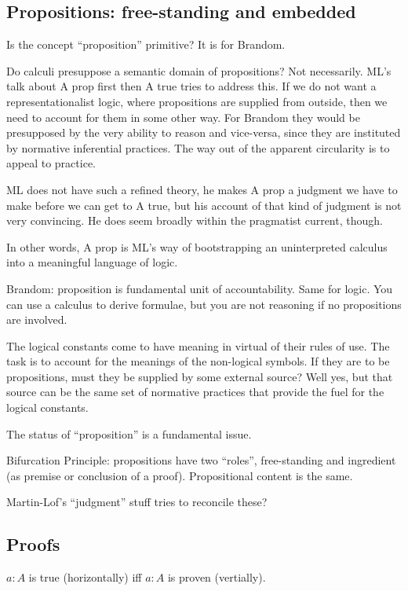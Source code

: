 \documentclass{article}
\begin{document}
\subsection{Propositions: free-standing and embedded}

Is the concept ``proposition'' primitive?  It is for Brandom.

Do calculi presuppose a semantic domain of propositions? Not
necessarily. ML's talk about A prop first then A true tries to address
this. If we do not want a representationalist logic, where
propositions are supplied from outside, then we need to account for
them in some other way. For Brandom they would be presupposed by the
very ability to reason and vice-versa, since they are instituted by
normative inferential practices. The way out of the apparent
circularity is to appeal to practice.

ML does not have such a refined theory, he makes A prop a judgment we
have to make before we can get to A true, but his account of that kind
of judgment is not very convincing. He does seem broadly within the
pragmatist current, though.

In other words, A prop is ML's way of bootstrapping an uninterpreted
calculus into a meaningful language of logic.

Brandom: proposition is fundamental unit of accountability. Same for
logic. You can use a calculus to derive formulae, but you are not
reasoning if no propositions are involved.

The logical constants come to have meaning in virtual of their rules
of use. The task is to account for the meanings of the non-logical
symbols. If they are to be propositions, must they be supplied by some
external source? Well yes, but that source can be the same set of
normative practices that provide the fuel for the logical constants.

The status of ``proposition'' is a fundamental issue.

Bifurcation Principle: propositions have two ``roles'', free-standing
and ingredient (as premise or conclusion of a proof). Propositional
content is the same.

Martin-Lof's ``judgment'' stuff tries to reconcile these?


\subsection{Proofs}


 \(a:A\) is true (horizontally) iff \(a:A\) is
proven (vertially).
\end{document}
